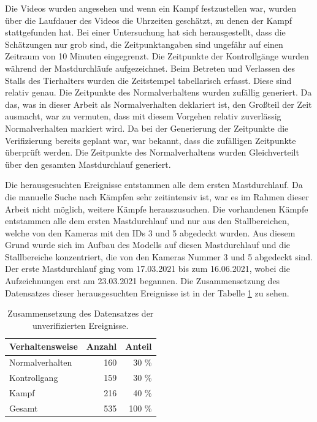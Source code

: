 Die Videos wurden angesehen und wenn ein Kampf festzustellen war, wurden über die Laufdauer des Videos die Uhrzeiten geschätzt, zu denen der Kampf stattgefunden hat. Bei einer Untersuchung hat sich herausgestellt, dass die Schätzungen nur grob sind, die Zeitpunktangaben sind ungefähr auf einen Zeitraum von 10 Minuten eingegrenzt. Die Zeitpunkte der Kontrollgänge wurden während der Mastdurchläufe aufgezeichnet. Beim Betreten und Verlassen des Stalls des Tierhalters wurden die Zeitstempel tabellarisch erfasst. Diese sind relativ genau. Die Zeitpunkte des Normalverhaltens wurden zufällig generiert. Da das, was in dieser Arbeit als Normalverhalten deklariert ist, den Großteil der Zeit ausmacht, war zu vermuten, dass mit diesem Vorgehen relativ zuverlässig Normalverhalten markiert wird. Da bei der Generierung der Zeitpunkte die Verifizierung bereits geplant war, war bekannt, dass die zufälligen Zeitpunkte überprüft werden. Die Zeitpunkte des Normalverhaltens wurden Gleichverteilt über den gesamten Mastdurchlauf generiert.\par

Die herausgesuchten Ereignisse entstammen alle dem ersten Mastdurchlauf. Da die manuelle Suche nach Kämpfen sehr zeitintensiv ist, war es im Rahmen dieser Arbeit nicht möglich, weitere Kämpfe herauszusuchen. Die vorhandenen Kämpfe entstammen alle dem ersten Mastdurchlauf und nur aus den Stallbereichen, welche von den Kameras mit den IDs 3 und 5 abgedeckt wurden. Aus diesem Grund wurde sich im Aufbau des Modells auf diesen Mastdurchlauf und die Stallbereiche konzentriert, die von den Kameras Nummer 3 und 5 abgedeckt sind. Der erste Mastdurchlauf ging vom 17.03.2021 bis zum 16.06.2021, wobei die Aufzeichnungen erst am 23.03.2021 begannen. Die Zusammensetzung des Datensatzes dieser herausgesuchten Ereignisse ist in der Tabelle \ref{tab:DataSetUnVeri} zu sehen.\par


\begin{table}[ht]
    \centering
    \caption{Zusammensetzung des Datensatzes der unverifizierten Ereignisse.}
    \begin{tabular}{|l|r|r|}
    \hline
        Verhaltensweise & Anzahl & Anteil \\
    \hline
        Normalverhalten & 160 & 30 \%\\
        Kontrollgang & 159 & 30 \%\\
        Kampf & 216 & 40 \%\\
    \hline
    \hline
        Gesamt & 535 & 100 \%\\
    \hline
    \end{tabular}
    \label{tab:DataSetUnVeri}
\end{table}


